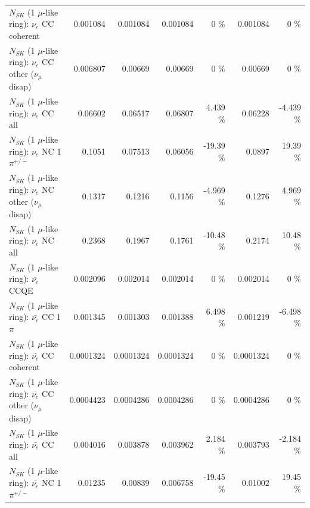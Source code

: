 \begin{table}
\begin{tabular}{| l | r | r | r  r | r  r |}
                               $N_{SK}$ (1 $\mu$-like ring): $\nu_e$ CC coherent &        0.001084 &        0.001084 &        0.001084 &        0 \%  &        0.001084 &        0 \%  \\ 
                $N_{SK}$ (1 $\mu$-like ring): $\nu_e$ CC other ($\nu_\mu$ disap) &        0.006807 &         0.00669 &         0.00669 &        0 \%  &         0.00669 &        0 \%  \\ 
                                  $N_{SK}$ (1 $\mu$-like ring): $\nu_{e}$ CC all &         0.06602 &         0.06517 &         0.06807 &    4.439 \%  &         0.06228 &   -4.439 \%  \\ 
\hline
                           $N_{SK}$ (1 $\mu$-like ring): $\nu_e$ NC 1$\pi^{+/-}$ &          0.1051 &         0.07513 &         0.06056 &   -19.39 \%  &          0.0897 &    19.39 \%  \\ 
                $N_{SK}$ (1 $\mu$-like ring): $\nu_e$ NC other ($\nu_\mu$ disap) &          0.1317 &          0.1216 &          0.1156 &   -4.969 \%  &          0.1276 &    4.969 \%  \\ 
                                  $N_{SK}$ (1 $\mu$-like ring): $\nu_{e}$ NC all &          0.2368 &          0.1967 &          0.1761 &   -10.48 \%  &          0.2174 &    10.48 \%  \\ 
\hline
\hline
\hline
                                $N_{SK}$ (1 $\mu$-like ring): $\bar{\nu_e}$ CCQE &        0.002096 &        0.002014 &        0.002014 &        0 \%  &        0.002014 &        0 \%  \\ 
                           $N_{SK}$ (1 $\mu$-like ring): $\bar{\nu_e}$ CC 1$\pi$ &        0.001345 &        0.001303 &        0.001388 &    6.498 \%  &        0.001219 &   -6.498 \%  \\ 
                         $N_{SK}$ (1 $\mu$-like ring): $\bar{\nu_e}$ CC coherent &       0.0001324 &       0.0001324 &       0.0001324 &        0 \%  &       0.0001324 &        0 \%  \\ 
          $N_{SK}$ (1 $\mu$-like ring): $\bar{\nu_e}$ CC other ($\nu_\mu$ disap) &       0.0004423 &       0.0004286 &       0.0004286 &        0 \%  &       0.0004286 &        0 \%  \\ 
                            $N_{SK}$ (1 $\mu$-like ring): $\bar{\nu_{e}}$ CC all &        0.004016 &        0.003878 &        0.003962 &    2.184 \%  &        0.003793 &   -2.184 \%  \\ 
\hline
                     $N_{SK}$ (1 $\mu$-like ring): $\bar{\nu_e}$ NC 1$\pi^{+/-}$ &         0.01235 &         0.00839 &        0.006758 &   -19.45 \%  &         0.01002 &    19.45 \%  \\ 

\end{tabular}
\end{table}
